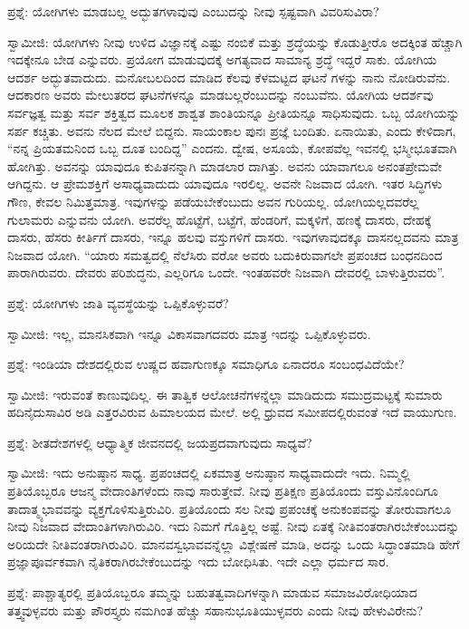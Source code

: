 ಪ್ರಶ್ನೆ: ಯೋಗಿಗಳು ಮಾಡಬಲ್ಲ ಅದ್ಭುತಗಳಾವುವು ಎಂಬುದನ್ನು ನೀವು ಸ್ಪಷ್ಟವಾಗಿ ವಿವರಿಸುವಿರಾ?

ಸ್ವಾಮೀಜಿ: ಯೋಗಿಗಳು ನೀವು ಉಳಿದ ವಿಜ್ಞಾನಕ್ಕೆ ಎಷ್ಟು ನಂಬಿಕೆ ಮತ್ತು ಶ್ರದ್ಧೆಯನ್ನು ಕೊಡುತ್ತೀರೊ ಅದಕ್ಕಿಂತ ಹೆಚ್ಚಾಗಿ ಇದಕ್ಕೇನೂ ಬೇಡ ಎನ್ನುವರು. ಪ್ರಯೋಗ ಮಾಡುವುದಕ್ಕೆ ಅಗತ್ಯವಾದ ಸಾಮಾನ್ಯ ಶ್ರದ್ಧೆ ಇದ್ದರೆ ಸಾಕು. ಯೋಗಿಯ ಆದರ್ಶ ಅದ್ಭುತವಾದುದು. ಮನೋಬಲದಿಂದ ಮಾಡಿದ ಕೆಲವು ಕೆಳಮಟ್ಟದ ಘಟನೆ ಗಳನ್ನು ನಾನು ನೋಡಿರುವೆನು. ಆದಕಾರಣ ಅವರು ಮೇಲುತರದ ಘಟನೆಗಳನ್ನೂ ಮಾಡಬಲ್ಲರೆಂಬುದನ್ನು ನಂಬುವೆನು. ಯೋಗಿಯ ಆದರ್ಶವು ಸರ್ವಜ್ಞತ್ವ ಮತ್ತು ಸರ್ವ ಶಕ್ತಿತ್ವದ ಮೂಲಕ ಶಾಶ್ವತ ಶಾಂತಿಯನ್ನೂ ಪ್ರೀತಿಯನ್ನೂ ಸಾಧಿಸುವುದು. ಒಬ್ಬ ಯೋಗಿಯನ್ನು ಸರ್ಪ ಕಚ್ಚಿತು. ಅವನು ನೆಲದ ಮೇಲೆ ಬಿದ್ದನು. ಸಾಯಂಕಾಲ ಪುನಃ ಪ್ರಜ್ಞೆ ಬಂದಿತು. ಏನಾಯಿತು, ಎಂದು ಕೇಳಿದಾಗ, “ನನ್ನ ಪ್ರಿಯತಮನಿಂದ ಒಬ್ಬ ದೂತ ಬಂದಿದ್ದ” ಎಂದನು. ದ್ವೇಷ, ಅಸೂಯೆ, ಕೋಪವೆಲ್ಲ ಇವನಲ್ಲಿ ಭಸ್ಮೀಭೂತವಾಗಿ ಹೋಗಿತ್ತು. ಅವನನ್ನು ಯಾವುದೂ ಕುಪಿತನನ್ನಾಗಿ ಮಾಡಲಾರ ದಾಗಿತ್ತು. ಅವನು ಯಾವಾಗಲೂ ಅನಂತಪ್ರೇಮವೇ ಆಗಿದ್ದನು. ಆ ಪ್ರೇಮಶಕ್ತಿಗೆ ಅಸಾಧ್ಯವಾದುದು ಯಾವುದೂ ಇರಲಿಲ್ಲ. ಅವನೇ ನಿಜವಾದ ಯೋಗಿ. ಇತರ ಸಿದ್ಧಿಗಳು ಗೌಣ, ಕೇವಲ ನಿಮಿತ್ತಮಾತ್ರ. ಇವುಗಳನ್ನು ಪಡೆಯಬೇಕೆಂಬುದು ಅವನ ಗುರಿಯಲ್ಲ. ಯೋಗಿಯಲ್ಲದವರೆಲ್ಲ ಗುಲಾಮರು ಎನ್ನುವನು ಯೋಗಿ. ಅವರೆಲ್ಲ ಹೊಟ್ಟೆಗೆ, ಬಟ್ಟೆಗೆ, ಹೆಂಡರಿಗೆ, ಮಕ್ಕಳಿಗೆ, ಹಣಕ್ಕೆ ದಾಸರು, ದೇಹಕ್ಕೆ ದಾಸರು, ಹೆಸರು ಕೀರ್ತಿಗೆ ದಾಸರು, ಇನ್ನೂ ಹಲವು ವಸ್ತುಗಳಿಗೆ ದಾಸರು. ಇವುಗಳಾವುದಕ್ಕೂ ದಾಸನಲ್ಲದವನು ಮಾತ್ರ ನಿಜವಾದ ಯೋಗಿ. “ಯಾರು ಸಮತ್ವದಲ್ಲಿ ನೆಲೆಸಿರು ವರೋ ಅವರು ಬದುಕಿರುವಾಗಲೇ ಪ್ರಪಂಚದ ಬಂಧನದಿಂದ ಪಾರಾಗಿರುವರು. ದೇವರು ಪರಿಶುದ್ಧನು, ಎಲ್ಲರಿಗೂ ಒಂದೇ. ಇಂತಹವರೇ ನಿಜವಾಗಿ ದೇವರಲ್ಲಿ ಬಾಳುತ್ತಿರುವರು”.

ಪ್ರಶ್ನೆ: ಯೋಗಿಗಳು ಜಾತಿ ವ್ಯವಸ್ಥೆಯನ್ನು ಒಪ್ಪಿಕೊಳ್ಳುವರೆ?

ಸ್ವಾಮೀಜಿ: ಇಲ್ಲ, ಮಾನಸಿಕವಾಗಿ ಇನ್ನೂ ವಿಕಾಸವಾಗದವರು ಮಾತ್ರ ಇದನ್ನು ಒಪ್ಪಿಕೊಳ್ಳುವರು.

ಪ್ರಶ್ನೆ: ಇಂಡಿಯಾ ದೇಶದಲ್ಲಿರುವ ಉಷ್ಣದ ಹವಾಗುಣಕ್ಕೂ ಸಮಾಧಿಗೂ ಏನಾದರೂ ಸಂಬಂಧವಿದೆಯೇ?

ಸ್ವಾಮೀಜಿ: ಇರುವಂತೆ ಕಾಣುವುದಿಲ್ಲ. ಈ ತಾತ್ವಿಕ ಆಲೋಚನೆಗಳನ್ನೆಲ್ಲಾ ಮಾಡಿದುದು ಸಮುದ್ರಮಟ್ಟಕ್ಕೆ ಸುಮಾರು ಹದಿನೈದುಸಾವಿರ ಅಡಿ ಎತ್ತರವಿರುವ ಹಿಮಾಲಯದ ಮೇಲೆ. ಅಲ್ಲಿ ಧ್ರುವದ ಸಮೀಪದಲ್ಲಿರುವಂತೆ ಇದೆ ವಾಯುಗುಣ.

ಪ್ರಶ್ನೆ: ಶೀತದೇಶಗಳಲ್ಲಿ ಆಧ್ಯಾತ್ಮಿಕ ಜೀವನದಲ್ಲಿ ಜಯಪ್ರದವಾಗುವುದು ಸಾಧ್ಯವೆ?

ಸ್ವಾಮೀಜಿ: ಇದು ಅನುಷ್ಠಾನ ಸಾಧ್ಯ. ಪ್ರಪಂಚದಲ್ಲಿ ಏಕಮಾತ್ರ ಅನುಷ್ಠಾನ ಸಾಧ್ಯವಾದುದೇ ಇದು. ನಿಮ್ಮಲ್ಲಿ ಪ್ರತಿಯೊಬ್ಬರೂ ಆಜನ್ಮ ವೇದಾಂತಿಗಳೆಂದು ನಾವು ಸಾರುತ್ತೇವೆ. ನೀವು ಪ್ರತಿಕ್ಷಣ ಪ್ರತಿಯೊಂದು ವಸ್ತುವಿನೊಂದಿಗೂ ತಾದಾತ್ಮ್ಯಭಾವವನ್ನು ವ್ಯಕ್ತಗೊಳಿಸುತ್ತಿರುವಿರಿ. ಪ್ರತಿಯೊಂದು ಸಲ ನೀವು ಪ್ರಪಂಚಕ್ಕೆ ಅನುಕಂಪವನ್ನು ತೋರುವಾಗಲೂ ನೀವು ನಿಜವಾದ ವೇದಾಂತಿಗಳಾಗಿರುವಿರಿ. ಇದು ನಿಮಗೆ ಗೊತ್ತಿಲ್ಲ ಅಷ್ಟೆ. ನೀವು ಏತಕ್ಕೆ ನೀತಿವಂತರಾಗಿರಬೇಕೆಂಬುದನ್ನು ಅರಿಯದೇ ನೀತಿವಂತರಾಗಿರುವಿರಿ. ಮಾನವಸ್ವಭಾವವನ್ನೆಲ್ಲಾ ವಿಶ್ಲೇಷಣೆ ಮಾಡಿ, ಅದನ್ನು ಒಂದು ಸಿದ್ಧಾಂತಮಾಡಿ ಹೇಗೆ ಪ್ರಜ್ಞಾಪೂರ್ವಕವಾಗಿ ನೈತಿಕರಾಗಿರಬೇಕೆಂಬುದನ್ನು ಇದು ಬೋಧಿಸಿತು. ಇದೇ ಎಲ್ಲಾ ಧರ್ಮದ ಸಾರ.

ಪ್ರಶ್ನೆ: ಪಾಶ್ಚಾತ್ಯರಲ್ಲಿ ಪ್ರತಿಯೊಬ್ಬರೂ ತಮ್ಮನ್ನು ಬಹುತತ್ವವಾದಿಗಳನ್ನಾಗಿ ಮಾಡುವ ಸಮಾಜವಿರೋಧಿಯಾದ ತತ್ತ್ವವುಳ್ಳವರು ಮತ್ತು ಪೌರಸ್ತ್ಯರು ನಮಗಿಂತ ಹೆಚ್ಚು ಸಹಾನುಭೂತಿಯುಳ್ಳವರು ಎಂದು ನೀವು ಹೇಳುವಿರೇನು?

